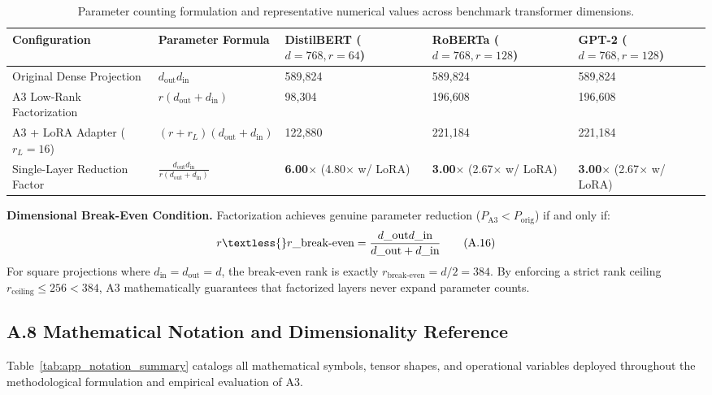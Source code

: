\begin{table}[H]
\centering
\small
\begin{tabular}{lllll}
\toprule
\textbf{Configuration} & \textbf{Parameter Formula} & \textbf{DistilBERT ($d=768, r=64$)} & \textbf{RoBERTa ($d=768, r=128$)} & \textbf{GPT-2 ($d=768, r=128$)} \\
\midrule
Original Dense Projection & $d_\text{out} d_\text{in}$ & 589,824 & 589,824 & 589,824 \\
A3 Low-Rank Factorization & $r(d_\text{out} + d_\text{in})$ & 98,304 & 196,608 & 196,608 \\
A3 + LoRA Adapter ($r_L=16$) & $(r + r_L)(d_\text{out} + d_\text{in})$ & 122,880 & 221,184 & 221,184 \\
Single-Layer Reduction Factor & $\frac{d_\text{out} d_\text{in}}{r(d_\text{out} + d_\text{in})}$ & \textbf{6.00$\times$} (4.80$\times$ w/ LoRA) & \textbf{3.00$\times$} (2.67$\times$ w/ LoRA) & \textbf{3.00$\times$} (2.67$\times$ w/ LoRA) \\
\bottomrule
\end{tabular}
\caption{Parameter counting formulation and representative numerical values across benchmark transformer dimensions.}
\label{tab:parameter_counting_formulation}
\end{table}

\textbf{Dimensional Break-Even Condition.} Factorization achieves genuine parameter reduction ($P_\text{A3} < P_\text{orig}$) if and only if:
\[
r \textless{} r\_\text{break-even} = \frac{d\_\text{out} d\_\text{in}}{d\_\text{out} + d\_\text{in}}
\tag{A.16}
\]
For square projections where $d_\text{in} = d_\text{out} = d$, the break-even rank is exactly $r_\text{break-even} = d/2 = 384$. By enforcing a strict rank ceiling $r_{\mathrm{ceiling}} \le 256 < 384$, A3 mathematically guarantees that factorized layers never expand parameter counts.

\subsection{A.8 Mathematical Notation and Dimensionality Reference}
\label{sec:app_notation}

Table~\ref{tab:app_notation_summary} catalogs all mathematical symbols, tensor shapes, and operational variables deployed throughout the methodological formulation and empirical evaluation of A3.

